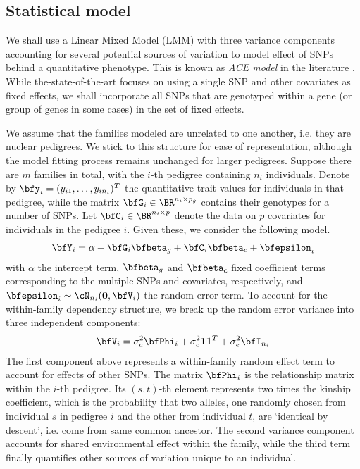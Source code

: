 \subsection{Statistical model}
We shall use a Linear Mixed Model (LMM) with three variance components accounting for several potential sources of variation to model effect of SNPs behind a quantitative phenotype. This is known as \textit{ACE model} in the literature \citep{KohlerEtal11}. While the-state-of-the-art focuses on using a single SNP and other covariates as fixed effects, we shall incorporate all SNPs that are genotyped within a gene (or group of genes in some cases) in the set of fixed effects.

We assume that the families modeled are unrelated to one another, i.e. they are nuclear pedigrees. We stick to this structure for ease of representation, although the model fitting process remains unchanged for larger pedigrees. Suppose there are $m$ families in total, with the $i$-th pedigree containing $n_i$ individuals. Denote by $\bfy_i = (y_{i 1}, \ldots, y_{i n_i})^T $ the quantitative trait values for individuals in that pedigree, while the matrix $\bfG_i \in \BR^{ n_i \times p_g}$ contains their genotypes for a number of SNPs. Let $\bfC_i \in \BR^{ n_i \times p}$ denote the data on $p$ covariates for individuals in the pedigree $i$. Given these, we consider the following model.
%
\begin{align}\label{eqn:LMMeqn}
\bfY_i = \alpha + \bfG_i \bfbeta_g + \bfC_i \bfbeta_c + \bfepsilon_i
\end{align}
%
with $\alpha$ the intercept term, $\bfbeta_g$ and $\bfbeta_c$ fixed coefficient terms corresponding to the multiple SNPs and covariates, respectively, and $\bfepsilon_i \sim \cN_{n_i} ({\bf 0}, \bfV_i)$ the random error term. To account for the within-family dependency structure, we break up the random error variance into three independent components:
%
\begin{align}\label{eqn:partsOfV}
\bfV_i = \sigma_a^2 \bfPhi_i + \sigma_c^2 {\bf 1} {\bf 1}^T + \sigma_e^2 \bfI_{n_i}
\end{align}
%
The first component above represents a within-family random effect term to account for effects of other SNPs. The matrix $\bfPhi_i$ is the relationship matrix within the $i$-th pedigree. Its $(s,t)$-th element represents two times the kinship coefficient, which is the probability that two alleles, one randomly chosen from individual $s$ in pedigree $i$ and the other from individual $t$, are `identical by descent', i.e. come from same common ancestor. The second variance component accounts for shared environmental effect within the family, while the third term finally quantifies other sources of variation unique to an individual.

